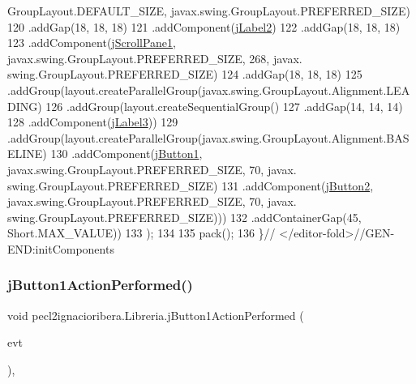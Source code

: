 \begin{DoxyCode}
      GroupLayout.DEFAULT\_SIZE, javax.swing.GroupLayout.PREFERRED\_SIZE)
120                 .addGap(18, 18, 18)
121                 .addComponent(\mbox{\hyperlink{classpecl2ignacioribera_1_1_libreria_ae67eba9f888cfa9d81bf5823148df302}{jLabel2}})
122                 .addGap(18, 18, 18)
123                 .addComponent(\mbox{\hyperlink{classpecl2ignacioribera_1_1_libreria_aae2f0b8fdb27291df13ef48000cf977a}{jScrollPane1}}, javax.swing.GroupLayout.PREFERRED\_SIZE, 268, javax.
      swing.GroupLayout.PREFERRED\_SIZE)
124                 .addGap(18, 18, 18)
125                 .addGroup(layout.createParallelGroup(javax.swing.GroupLayout.Alignment.LEADING)
126                     .addGroup(layout.createSequentialGroup()
127                         .addGap(14, 14, 14)
128                         .addComponent(\mbox{\hyperlink{classpecl2ignacioribera_1_1_libreria_ad4888d81e2513361bb8f3e6c3cb6c7b2}{jLabel3}}))
129                     .addGroup(layout.createParallelGroup(javax.swing.GroupLayout.Alignment.BASELINE)
130                         .addComponent(\mbox{\hyperlink{classpecl2ignacioribera_1_1_libreria_a50c2a801f0096a4409e9348d6df5cd09}{jButton1}}, javax.swing.GroupLayout.PREFERRED\_SIZE, 70, javax.
      swing.GroupLayout.PREFERRED\_SIZE)
131                         .addComponent(\mbox{\hyperlink{classpecl2ignacioribera_1_1_libreria_a56f076c83a5c4630f48f3f6ccc764d90}{jButton2}}, javax.swing.GroupLayout.PREFERRED\_SIZE, 70, javax.
      swing.GroupLayout.PREFERRED\_SIZE)))
132                 .addContainerGap(45, Short.MAX\_VALUE))
133         );
134 
135         pack();
136     \}\textcolor{comment}{// </editor-fold>//GEN-END:initComponents}
\end{DoxyCode}
\mbox{\label{classpecl2ignacioribera_1_1_libreria_a9ecfee92a566b51546110c242da8ff2a}} 
\subsubsection{\texorpdfstring{j\+Button1\+Action\+Performed()}{jButton1ActionPerformed()}}
{\footnotesize\ttfamily void pecl2ignacioribera.\+Libreria.\+j\+Button1\+Action\+Performed (\begin{DoxyParamCaption}\item[{java.\+awt.\+event.\+Action\+Event}]{evt }\end{DoxyParamCaption})\hspace{0.3cm}{\ttfamily [inline]}, {\ttfamily [private]}}


